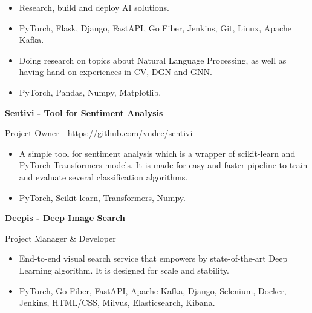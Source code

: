 \documentclass[11pt,a4paper]{altacv}
\newcommand{\cvproject}[1]{%
	{\textbf{\color{accent}#1}\par}
}
\begin{document}

\begin{fullwidth}
\makecvheader
\end{fullwidth}

\begin{itemize}
	\item Research, build and deploy AI solutions. 
	\item PyTorch, Flask, Django, FastAPI, Go Fiber, Jenkins, Git, Linux, Apache Kafka.
\end{itemize}
\smallskip
\smallskip
{}
\begin{itemize}
	\item Doing research on topics about Natural Language Processing, as well as having hand-on experiences in CV, DGN and GNN. 
	\item PyTorch, Pandas, Numpy, Matplotlib.
\end{itemize}

\cvproject{Sentivi - Tool for Sentiment Analysis} {Project Owner - \href{https://github.com/vndee/sentivi}{https://github.com/vndee/sentivi}}
\begin{itemize}
	\item A simple tool for sentiment analysis which is a wrapper of scikit-learn and PyTorch Transformers models. It is made for easy and faster pipeline to train and evaluate several classification algorithms. 
	\item PyTorch, Scikit-learn, Transformers, Numpy. 
\end{itemize}

\cvproject{Deepis - Deep Image Search} {Project Manager \& Developer}
\begin{itemize}
	\item End-to-end visual search service that empowers by state-of-the-art Deep Learning algorithm. It is designed for scale and stability. 
	\item PyTorch, Go Fiber, FastAPI, Apache Kafka,  Django, Selenium, Docker, Jenkins, HTML/CSS, Milvus, Elasticsearch, Kibana.
\end{itemize} 
\end{document}
